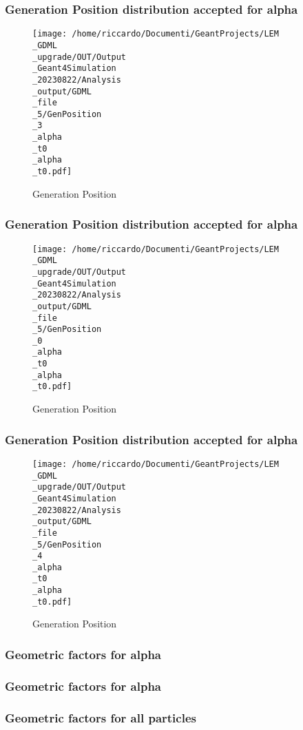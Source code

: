 \documentclass[8pt]{beamer}
\begin{document}
            \begin{frame}
                \frametitle{Generation Position distribution accepted for alpha}
            
        \begin{figure}[h]
            \centering
            \texttt{[image: /home/riccardo/Documenti/GeantProjects/LEM\\\_GDML\\\_upgrade/OUT/Output\\\_Geant4Simulation\\\_20230822/Analysis\\\_output/GDML\\\_file\\\_5/GenPosition\\\_3\\\_alpha\\\_t0\\\_alpha\\\_t0.pdf]}
            \caption{Generation Position}
        \end{figure}
        
            \end{frame}
            
            \begin{frame}
                \frametitle{Generation Position distribution accepted for alpha}
            
        \begin{figure}[h]
            \centering
            \texttt{[image: /home/riccardo/Documenti/GeantProjects/LEM\\\_GDML\\\_upgrade/OUT/Output\\\_Geant4Simulation\\\_20230822/Analysis\\\_output/GDML\\\_file\\\_5/GenPosition\\\_0\\\_alpha\\\_t0\\\_alpha\\\_t0.pdf]}
            \caption{Generation Position}
        \end{figure}
        
            \end{frame}
            
            \begin{frame}
                \frametitle{Generation Position distribution accepted for alpha}
            
        \begin{figure}[h]
            \centering
            \texttt{[image: /home/riccardo/Documenti/GeantProjects/LEM\\\_GDML\\\_upgrade/OUT/Output\\\_Geant4Simulation\\\_20230822/Analysis\\\_output/GDML\\\_file\\\_5/GenPosition\\\_4\\\_alpha\\\_t0\\\_alpha\\\_t0.pdf]}
            \caption{Generation Position}
        \end{figure}
        
            \end{frame}
            
            \begin{frame}
                \frametitle{Geometric factors for alpha}
            
            \end{frame}
            
            \begin{frame}
                \frametitle{Geometric factors for alpha}
            
            \end{frame}
            
            \begin{frame}
                \frametitle{Geometric factors for all particles}
            
            \end{frame}
            
        
\end{document}
